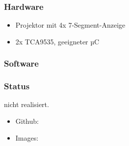 \documentclass[a4paper,twoside,titlepage,normalheadings,tocleft,bibtotoc]{scrartcl}
\begin{document}

\subsubsection{Hardware}
\begin{itemize}
\item Projektor mit 4x 7-Segment-Anzeige
\item 2x TCA9535, geeigneter µC
\end{itemize}
\subsubsection{Software}
\subsubsection{Status}
nicht realisiert.

\begin{itemize}
\item Github:  
\item Images:
\end{itemize}
\end{document}
